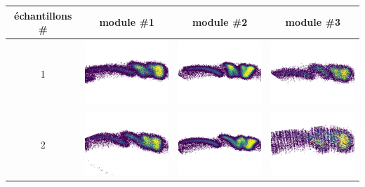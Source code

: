 \begin{table}[h]
\centering
\begin{tabular}{|c|c|c|c|}
\hline
échantillons \# & module \#1 & module \#2 & module \#3\\
\hline
1 & \includegraphics[scale=0.4]{images/m11.png} & \includegraphics[scale=0.4]{images/m21.png} & \includegraphics[scale=0.4]{images/m31.png}  \\
\hline
2 & \includegraphics[scale=0.4]{images/m12.png} & \includegraphics[scale=0.4]{images/m22.png} & \includegraphics[scale=0.4]{images/m32.png}  \\

\end{tabular}
\end{table}
